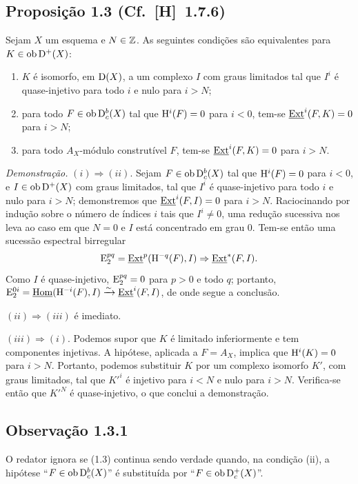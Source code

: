 \subsection*{Proposição 1.3 {\normalfont (Cf.~[H]~1.7.6)}}
Sejam $X$ um esquema e $N \in \mathbb{Z}$. As seguintes condições são equivalentes para $K \in \operatorname{ob} \mathrm{D}^{+}(X)$:
\begin{enumerate}[label=(\roman*)]
\item $K$ é isomorfo, em $\mathrm{D}(X)$, a um complexo $I$ com graus limitados tal que $I^i$ é quase-injetivo para todo $i$ e nulo para $i > N$;
\item para todo $F \in \operatorname{ob} \mathrm{D}_c^{b}(X)$ tal que $\mathrm{H}^i(F) = 0$ para $i < 0$, tem-se $\underline{\operatorname{Ext}}^i(F,K) = 0$ para $i > N$;
\item para todo $A_X$-módulo construtível $F$, tem-se $\underline{\operatorname{Ext}}^i(F,K) = 0$ para $i > N$.
\end{enumerate}

\emph{Demonstração.} $(i) \Rightarrow (ii)$. Sejam $F \in \operatorname{ob} \mathrm{D}_c^{b}(X)$ tal que $\mathrm{H}^i(F) = 0$ para $i < 0$, e $I \in \operatorname{ob} \mathrm{D}^{+}(X)$ com graus limitados, tal que $I^i$ é quase-injetivo para todo $i$ e nulo para $i > N$; demonstremos que $\underline{\operatorname{Ext}}^i(F,I) = 0$ para $i > N$. Raciocinando por indução sobre o número de índices $i$ tais que $I^i \neq 0$, uma redução sucessiva nos leva ao caso em que $N = 0$ e $I$ está concentrado em grau $0$. Tem-se então uma sucessão espectral birregular
\[
\mathrm{E}_2^{pq} = \underline{\operatorname{Ext}}^p(\mathrm{H}^{-q}(F),I) \Rightarrow \underline{\operatorname{Ext}}^{*}(F,I).
\]
Como $I$ é quase-injetivo, $\mathrm{E}_2^{pq} = 0$ para $p > 0$ e todo $q$; portanto, $\mathrm{E}_2^{0i} = \underline{\operatorname{Hom}}(\mathrm{H}^{-i}(F),I) \xrightarrow{\sim} \underline{\operatorname{Ext}}^i(F,I)$, de onde segue a conclusão.

$(ii) \Rightarrow (iii)$ é imediato.

$(iii) \Rightarrow (i)$. Podemos supor que $K$ é limitado inferiormente e tem componentes injetivas. A hipótese, aplicada a $F = A_X$, implica que $\mathrm{H}^i(K) = 0$ para $i > N$. Portanto, podemos substituir $K$ por um complexo isomorfo $K'$, com graus limitados, tal que $K'^i$ é injetivo para $i < N$ e nulo para $i > N$. Verifica-se então que $K'^N$ é quase-injetivo, o que conclui a demonstração.

\subsection*{Observação 1.3.1}
O redator ignora se (1.3) continua sendo verdade quando, na condição (ii), a hipótese ``$F \in \operatorname{ob} \mathrm{D}_c^{b}(X)$'' é substituída por ``$F \in \operatorname{ob} \mathrm{D}_c^{+}(X)$''.
